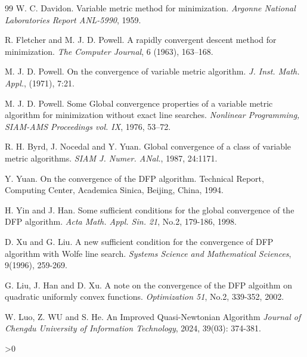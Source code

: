 \documentclass[12pt,a4paper,draft]{beamer}  %
\newcommand{\bibfile}{\jobname.bib}  %
\newcounter{cite}
\theoremstyle{definition}
\numberwithin{equation}{section}
\begin{document}
\begin{thebibliography}{99}
    W. C. Davidon. 
    Variable metric method for minimization.
    \textit{Argonne National Laboratories Report ANL-5990}, 1959.

    R. Fletcher and M. J. D. Powell.
    A rapidly convergent descent method for minimization.
    \textit{The Computer Journal}, 6 (1963), 163–168.

    M. J. D. Powell.
    On the convergence of variable metric algorithm.
    \textit{J. Inst. Math. Appl.}, (1971), 7:21.

    M. J. D. Powell.
    Some Global convergence properties of a variable metric algorithm for minimization without exact line searches.
    \textit{Nonlinear Programming, SIAM-AMS Proceedings vol. IX}, 1976, 53–72.

    R. H. Byrd, J. Nocedal and Y. Yuan.
    Global convergence of a class of variable metric algorithms.
    \textit{SIAM J. Numer. ANal.}, 1987, 24:1171.

    Y. Yuan.
    On the convergence of the DFP algorithm.
    Technical Report, Computing Center, Academica Sinica, Beijing, China, 1994.

    H. Yin and J. Han.
    Some sufficient conditions for the global convergence of the DFP algorithm.
   \textit{Acta Math. Appl. Sin. 21}, No.2, 179-186, 1998.

    D. Xu and G. Liu.
    A new sufficient condition for the convergence of DFP algorithm with Wolfe line search.
    \textit{Systems Science and Mathematical Sciences}, 9(1996), 259-269.

    G. Liu, J. Han and D. Xu.
    A note on the convergence of the DFP algoithm on quadratic uniformly convex functions.
    \textit{Optimization 51}, No.2, 339-352, 2002.

    W. Luo, Z. WU and S. He.
    An Improved Quasi-Newtonian Algorithm
    \textit{Journal of Chengdu University of Information Technology}, 2024, 39(03): 374-381.



\end{thebibliography}

\ifnum\value{cite}>0
    \small
    
    
\fi

\end{document}
